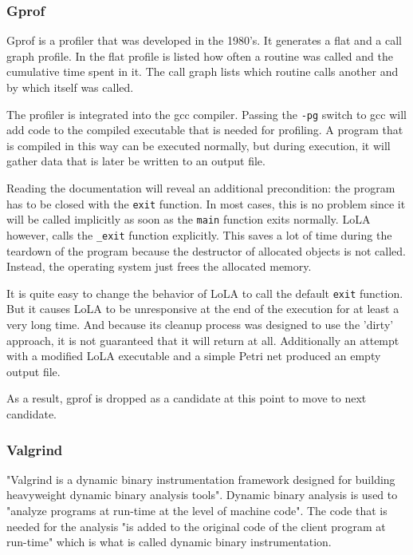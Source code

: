 \subsubsection{Gprof}
Gprof is a profiler that was developed in the 1980's. It generates a flat and a call graph profile\cite{graham1982gprof}. In the flat profile is listed how often a routine was called and the cumulative time spent in it. The call graph lists which routine calls another and by which itself was called.

The profiler is integrated into the gcc compiler. Passing the \texttt{-pg} switch to gcc will add code to the compiled executable that is needed for profiling. A program that is compiled in this way can be executed normally, but during execution, it will gather data that is later be written to an output file.

Reading the documentation will reveal an additional precondition: the program has to be closed with the \texttt{exit} function. In most cases, this is no problem since it will be called implicitly as soon as the \texttt{main} function exits normally. LoLA however, calls the \texttt{\_exit} function explicitly. This saves a lot of time during the teardown of the program because the destructor of allocated objects is not called. Instead, the operating system just frees the allocated memory.

It is quite easy to change the behavior of LoLA to call the default \texttt{exit} function. But it causes LoLA to be unresponsive at the end of the execution for at least a very long time. And because its cleanup process was designed to use the 'dirty' approach, it is not guaranteed that it will return at all. Additionally an attempt with a modified LoLA executable and a simple Petri net produced an empty output file.

As a result, gprof is dropped as a candidate at this point to move to next candidate.

\subsubsection{Valgrind}
"Valgrind is a dynamic binary instrumentation framework designed for building heavyweight dynamic binary analysis tools"\cite{nethercote2007valgrind}. Dynamic binary analysis is used to "analyze programs at run-time at the level of machine code". The code that is needed for the analysis "is added to the original code of the client program at run-time" which is what is called dynamic binary instrumentation.

